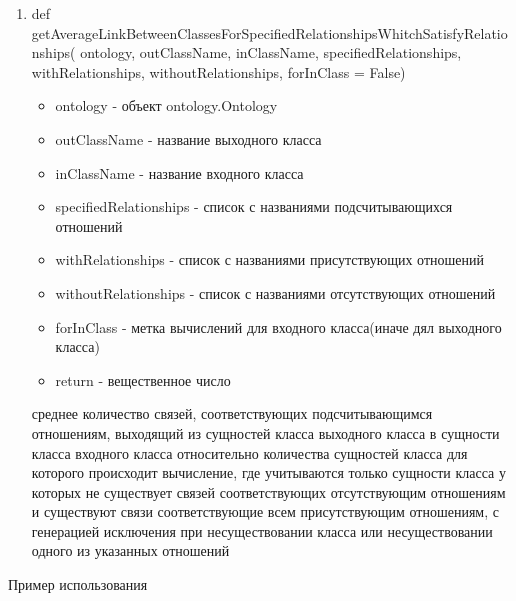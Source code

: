 \documentclass{article}
\begin{document}
\begin{enumerate}
		\item def getAverageLinkBetweenClassesForSpecifiedRelationshipsWhitchSatisfyRelationships(
		ontology, outClassName, inClassName, specifiedRelationships, withRelationships, withoutRelationships, forInClass = False)
		\begin{itemize}
			\item ontology - объект ontology.Ontology
			\item outClassName - название выходного класса
			\item inClassName - название входного класса
			\item specifiedRelationships - список с названиями подсчитывающихся отношений
			\item withRelationships - список с названиями присутствующих отношений
			\item withoutRelationships - список с названиями отсутствующих отношений
			\item forInClass - метка вычислений для входного класса(иначе дял выходного класса)
			\item return - вещественное число
		\end{itemize}
		среднее количество связей, соответствующих подсчитывающимся отношениям, выходящий из сущностей класса выходного класса в сущности класса входного класса относительно количества сущностей класса для которого происходит вычисление, где учитываются только сущности класса у которых не существует связей соответствующих отсутствующим отношениям и существуют связи соответствующие всем присутствующим отношениям, с генерацией исключения при несуществовании класса или несуществовании одного из указанных отношений 
	\end{enumerate}
	
	Пример использования
	
\end{document}
